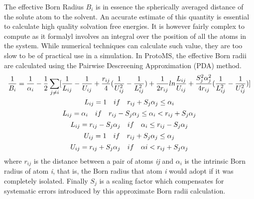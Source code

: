 \documentclass[letterpaper,10pt,english]{manual}
\begin{document}
The effective Born Radius $B_{i}$ is in essence the spherically averaged distance of the solute atom to the solvent. An accurate estimate of this quantity is essential to calculate high quality solvation free energies. It is however fairly complex to compute as it formalyl involves an integral over the position of all the atoms in the system. While numerical techniques can calculate such value, they are too slow to be of practical use in a simulation. In ProtoMS, the effective Born radii are calculated using the Pairwise Descreening Approximation (PDA) method.
\begin{gather}
\begin{split}{\frac{1}{B_i}} = \frac{1}{\alpha _{i}} - \frac{1}{2} \sum_{j \not= i} \lbrack \frac{1}{L_{ij}}-\frac{1}{U_{ij}}+\frac{r_{ij}}{4}(\frac{1}{U_{ij}^{2}}-\frac{1}{L_{ij}^{2}}) +\frac{1}{2r_{ij}}ln\frac{L_{ij}}{U_{ij}} + \frac{S_{j}^{2}\alpha_{j}^{2}}{4r_{ij}}(\frac{1}{L_{ij}^{2}}-\frac{1}{U_{ij}^{2}} ) \rbrack\end{split}\notag\\\begin{split}L_{ij} &= 1 \quad if \quad r_{ij} + S_{j}\alpha_{j} \leq \alpha_{i} \\\end{split}\notag\\\begin{split}L_{ij} &= \alpha_{i} \quad if \quad r_{ij} - S_{j}\alpha_{j} \leq \alpha_{i}  <r_{ij} + S_{j}\alpha_{j}\\\end{split}\notag\\\begin{split}L_{ij} &= r_{ij} - S_{j}\alpha_{j} \quad if \quad \alpha_{i} \leq r_{ij} - S_{j}\alpha_{j}\\\end{split}\notag\\\begin{split}U_{ij} &= 1 \quad if \quad  r_{ij} + S_{j}\alpha_{j} \leq \alpha_{j}\\\end{split}\notag\\\begin{split}U_{ij} &= r_{ij} + S_{j}\alpha_{j} \quad if \quad \alpha{i} <  r_{ij} + S_{j}\alpha_{j}\\\end{split}\notag
\end{gather}
where $r_{ij}$ is the distance between a pair of atoms \emph{ij} and $\alpha_{i}$ is the intrinsic Born radius of atom \emph{i}, that is, the Born radius that atom \emph{i} would adopt if it was completely isolated. Finally $S_{j}$ is a scaling factor which compensates for systematic errors introduced by this approximate Born radii calculation.
\end{document}
